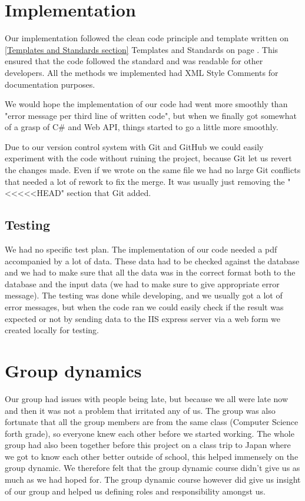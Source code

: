 \section{Implementation}
Our implementation followed the clean code principle and template written on \ref{Templates and Standards section} Templates and Standards on page \pageref{Templates and Standards section}. This ensured that the code followed the standard and was readable for other developers. All the methods we implemented had XML Style Comments for documentation purposes.

We would hope the implementation of our code had went more smoothly than "error message per third line of written code", but when we finally got somewhat of a grasp of C\# and Web API, things started to go a little more smoothly.

Due to our version control system with Git and GitHub we could easily experiment with the code without ruining the project, because Git let us revert the changes made. Even if we wrote on the same file we had no large Git conflicts that needed a lot of rework to fix the merge. It was usually just removing the "<<<<<HEAD" section that Git added.

\subsection{Testing}
We had no specific test plan. The implementation of our code needed a pdf accompanied by a lot of data. These data had to be checked against the database and we had to make sure that all the data was in the correct format both to the database and the input data (we had to make sure to give appropriate error message). The testing was done while developing, and we usually got a lot of error messages, but when the code ran we could easily check if the result was expected or not by sending data to the IIS express server via a web form we created locally for testing.

\section{Group dynamics}
Our group had issues with people being late, but because we all were late now and then it was not a problem that irritated any of us. The group was also fortunate that all the group members are from the same class (Computer Science forth grade), so everyone knew each other before we started working. The whole group had also been together before this project on a class trip to Japan where we got to know each other better outside of school, this helped immensely on the group dynamic. We therefore felt that the group dynamic course didn't give us as much as we had hoped for. The group dynamic course however did give us insight of our group and helped us defining roles and responsibility amongst us.



